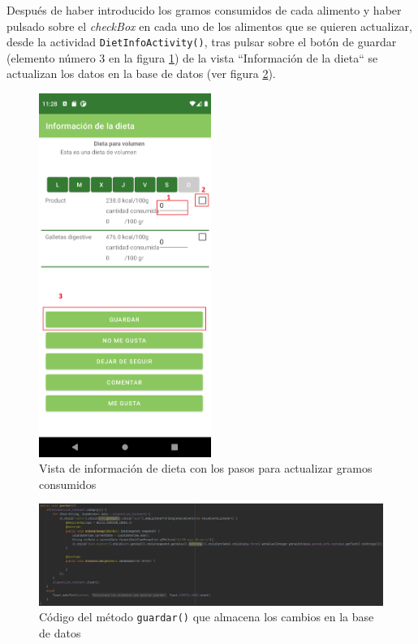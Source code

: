 Después de haber introducido los gramos consumidos de cada alimento y haber pulsado sobre el \textit{checkBox} en cada uno de los alimentos que se quieren actualizar, desde la actividad \texttt{DietInfoActivity()}, tras pulsar sobre el botón de guardar (elemento número 3 en la figura \ref{fig:modinfodieta}) de la vista ``Información de la dieta`` se actualizan los datos en la base de datos (ver figura \ref{fig:savedieta}).

\begin{figure}[H]
    \centering
    \includegraphics[width=0.5\textwidth]{Images/Capitulo7/modinfodieta.png}
    \caption{Vista de información de dieta con los pasos para actualizar gramos consumidos}
    \label{fig:modinfodieta}
\end{figure}

\begin{figure}[H]
    \centering
    \includegraphics[width=\textwidth]{Images/Capitulo7/savedieta.png}
    \caption{Código del método \texttt{guardar()} que almacena los cambios en la base de datos}
    \label{fig:savedieta}
\end{figure}

